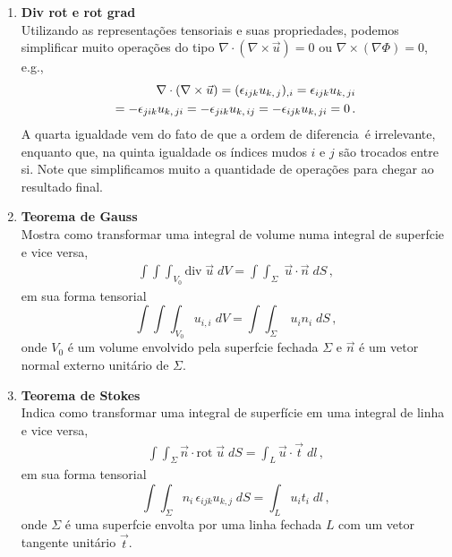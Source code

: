 \begin{enumerate}
\item{\bf Div rot e rot grad}\\
   Utilizando as representa\c{c}\~oes tensoriais e suas propriedades,
    podemos simplificar muito opera\c{c}\~oes do tipo $\nabla\cdot(\nabla\times\vec{u}) = 0$
    ou $\nabla\times(\nabla\Phi) = 0$, e.g.,
    \begin{eqnarray}
      \nabla\cdot(\nabla\times\vec{u}) = (\epsilon_{ijk}u_{k,\thinspace j})_{,i} = \epsilon_{ijk}u_{k,\thinspace ji} \nonumber \\
      = -\epsilon_{jik}u_{k,\thinspace ji} = -\epsilon_{jik}u_{k,\thinspace ij} = -\epsilon_{ijk}u_{k,\thinspace ji} = 0 \, .%
    \end{eqnarray}
    A quarta igualdade vem do fato de que a ordem de diferencia\cao\
    \'e irrelevante, enquanto que, na quinta igualdade os \'indices
    mudos $i$ e $j$ s\~ao trocados entre si.
    Note que simplificamos muito a
    quantidade de opera\c{c}\~oes para chegar ao resultado final.
\\

\item {\bf Teorema de Gauss}\\
Mostra como transformar uma integral de volume numa integral de
superf\ih cie e vice versa,
\begin{eqnarray}
\int\!\!\!\int\!\!\!\int_{V_0} \mbox{div}\; \vec{u}\; dV = 
  \int\!\!\!\int_{\Sigma}\; \vec{u}\cdot\vec{n}\; dS \, ,
\end{eqnarray}
em sua forma tensorial
\begin{equation}
  \int\!\!\!\int\!\!\!\int_{V_0} u_{i,i}\; dV = 
  \int\!\!\!\int_{\Sigma}\; u_in_i \;dS \, ,
\end{equation}
onde $V_0$ \'e um volume envolvido pela superf\ih cie fechada
$\Sigma$ e $\vec{n}$ \'e um vetor normal externo unit\'ario de
$\Sigma$.

\item {\bf Teorema de Stokes}\\
Indica como transformar uma integral de superf\'icie em uma
integral de linha e vice versa,
\begin{eqnarray}
\int\!\!\!\int_{\Sigma}\vec{n}\cdot\mbox{rot}\; \vec{u}\; dS =
  \int_{L}\vec{u}\cdot\vec{t}\; dl\, ,
\end{eqnarray}
em sua forma tensorial
\begin{equation}
  \int\!\!\!\int_{\Sigma}n_i\,\epsilon_{ijk}u_{k,j}\; dS = \int_{L}u_it_i\; dl\,
  ,
\end{equation}
onde $\Sigma$ \'e uma superf\ih cie envolta por uma linha fechada
$L$ com um vetor tangente unit\'ario $\vec{t}$.

\end{enumerate}

